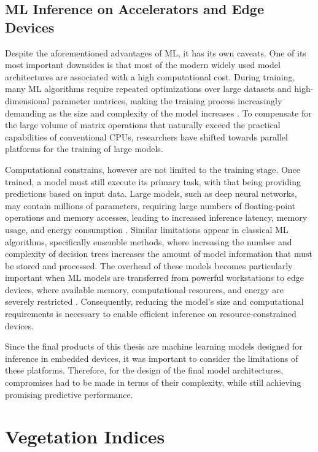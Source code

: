 \subsection{ML Inference on Accelerators and Edge Devices}

Despite the aforementioned advantages of ML, it has its own caveats. One of its most important downsides is that most of the modern widely used model architectures are associated with a high computational cost. During training, many ML algorithms require repeated optimizations over large datasets and high-dimensional parameter matrices, making the training process increasingly demanding as the size and complexity of the model increases \cite{large-scale-ml}. To compensate for the large volume of matrix operations that naturally exceed the practical capabilities of conventional CPUs, researchers have shifted towards parallel platforms for the training of large models.

Computational constrains, however are not limited to the training stage. Once trained, a model must still execute its primary task, with that being providing predictions based on input data. Large models, such as deep neural networks, may contain millions of parameters, requiring large numbers of floating-point operations and memory accesses, leading to increased inference latency, memory usage, and energy consumption \cite{efficient-DNN}. Similar limitations appear in classical ML algorithms, specifically ensemble methods, where increasing the number and complexity of decision trees increases the amount of model information that must be stored and processed. The overhead of these models becomes particularly important when ML models are transferred from powerful workstations to edge devices, where available memory, computational resources, and energy are severely restricted \cite{splitting-stump}. Consequently, reducing the model's size and computational requirements is necessary to enable efficient inference on resource-constrained devices.

Since the final products of this thesis are machine learning models designed for inference in embedded devices, it was important to consider the limitations of these platforms. Therefore, for the design of the final model architectures, compromises had to be made in terms of their complexity, while still achieving promising predictive performance.

\section{Vegetation Indices}

